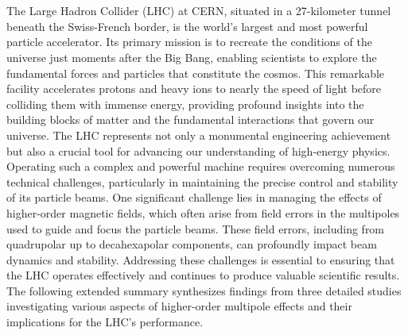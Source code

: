 \chapter{}





{
\fontsize{\fontsizesummary}{\fontskipsummary}\selectfont

The Large Hadron Collider (LHC) at CERN, situated in a 27-kilometer tunnel beneath the Swiss-French
border, is the world's largest and most powerful particle accelerator. Its primary mission is to
recreate the conditions of the universe just moments after the Big Bang, enabling scientists to
explore the fundamental forces and particles that constitute the cosmos. This remarkable facility
accelerates protons and heavy ions to nearly the speed of light before colliding them with immense
energy, providing profound insights into the building blocks of matter and the fundamental
interactions that govern our universe. The LHC represents not only a monumental engineering
achievement but also a crucial tool for advancing our understanding of high-energy physics. \\
\indent
Operating such a complex and powerful machine requires overcoming numerous technical challenges,
particularly in maintaining the precise control and stability of its particle beams. One significant
challenge lies in managing the effects of higher-order magnetic fields, which often arise from field
errors in the multipoles used to guide and focus the particle beams. These field errors,
including from quadrupolar up to decahexapolar components, can profoundly impact beam dynamics and
stability. Addressing these challenges is essential to ensuring that the LHC operates effectively
and continues to produce valuable scientific results. The following extended summary synthesizes
findings from three detailed studies investigating various aspects of higher-order multipole effects
and their implications for the LHC's performance.

}
